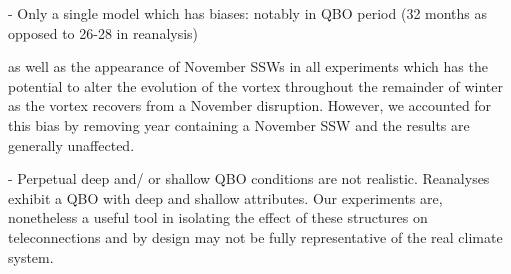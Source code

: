 - Only a single model which has biases: 
    notably in QBO period (32 months as opposed to 26-28 in reanalysis) 

    as well as the appearance of November SSWs in all experiments which has the potential to alter the evolution of the vortex throughout the remainder of winter as the vortex recovers from a November disruption. However, we accounted for this bias by removing year containing a November SSW and the results are generally unaffected.

- Perpetual deep and/ or shallow QBO conditions are not realistic. Reanalyses exhibit a QBO with deep and shallow attributes. Our experiments are, nonetheless a useful tool in isolating the effect of these structures on teleconnections and by design may not be fully representative of the real climate system. 


